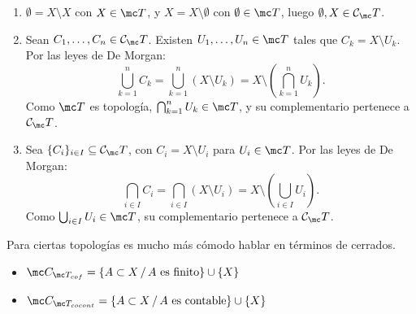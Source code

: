 \begin{dem}
\begin{enumerate}
    \item[\textbf{1)}] \(\emptyset = X \setminus X\) con \(X \in \mc T\), y \(X = X \setminus \emptyset\) con \(\emptyset \in \mc T\), luego \(\emptyset, X \in \mathcal{C}_\mc T\).
    \item[\textbf{2)}] Sean \(C_1, \ldots, C_n \in \mathcal{C}_\mc T\). Existen \(U_1, \ldots, U_n \in \mc T\) tales que \(C_k = X \setminus U_k\). Por las leyes de De Morgan:
    \[
        \bigcup_{k=1}^n C_k = \bigcup_{k=1}^n (X \setminus U_k) = X \setminus \left(\bigcap_{k=1}^n U_k\right) \text{}.
    \]
    Como \(\mc T\) es topología, \(\bigcap_{k=1}^n U_k \in \mc T\), y su complementario pertenece a \(\mathcal{C}_\mc T\).
    \item[\textbf{3)}] Sea \(\{C_i\}_{i \in I} \subseteq \mathcal{C}_\mc T\), con \(C_i = X \setminus U_i\) para \(U_i \in \mc T\). Por las leyes de De Morgan:
    \[
        \bigcap_{i \in I} C_i = \bigcap_{i \in I} (X \setminus U_i) = X \setminus \left(\bigcup_{i \in I} U_i\right) \text{}.
    \]
    Como \(\bigcup_{i \in I} U_i \in \mc T\), su complementario pertenece a \(\mathcal{C}_\mc T\).
\end{enumerate}
\end{dem}
\begin{obs}
    Para ciertas topolog\'ias es mucho m\'as c\'omodo hablar en t\'erminos de cerrados.
    \begin{itemize}
        \item $\mc C_{\mc T_{cof}} = \{A\subset X \, / \, A \text{ es finito}\} \cup \{X\}$
        \item $\mc C_{\mc T_{cocont}} = \{A\subset X \, / \, A \text{ es contable}\} \cup \{X\}$
    \end{itemize}
\end{obs}
